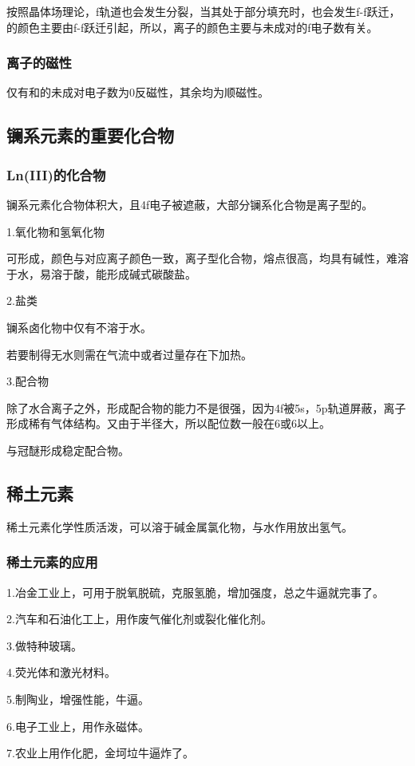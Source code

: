 \documentclass[a4paper,UTF8]{article}
\begin{document}
按照晶体场理论，f轨道也会发生分裂，当其处于部分填充时，也会发生f-f跃迁，的颜色主要由f-f跃迁引起，所以，离子的颜色主要与未成对的f电子数有关。

\subsubsection{离子的磁性}

仅有和的未成对电子数为0反磁性，其余均为顺磁性。

\subsection{镧系元素的重要化合物}

\subsubsection{Ln(III)的化合物}

镧系元素化合物体积大，且4f电子被遮蔽，大部分镧系化合物是离子型的。

1.氧化物和氢氧化物

可形成，颜色与对应离子颜色一致，离子型化合物，熔点很高，均具有碱性，难溶于水，易溶于酸，能形成碱式碳酸盐。

2.盐类

镧系卤化物中仅有不溶于水。

若要制得无水则需在气流中或者过量存在下加热。

3.配合物

除了水合离子之外，形成配合物的能力不是很强，因为4f被5s，5p轨道屏蔽，离子形成稀有气体结构。又由于半径大，所以配位数一般在6或6以上。

与冠醚形成稳定配合物。

\subsection{稀土元素}

稀土元素化学性质活泼，可以溶于碱金属氯化物，与水作用放出氢气。

\subsubsection{稀土元素的应用}

1.冶金工业上，可用于脱氧脱硫，克服氢脆，增加强度，总之牛逼就完事了。

2.汽车和石油化工上，用作废气催化剂或裂化催化剂。

3.做特种玻璃。

4.荧光体和激光材料。

5.制陶业，增强性能，牛逼。

6.电子工业上，用作永磁体。

7.农业上用作化肥，金坷垃牛逼炸了。
\end{document}
